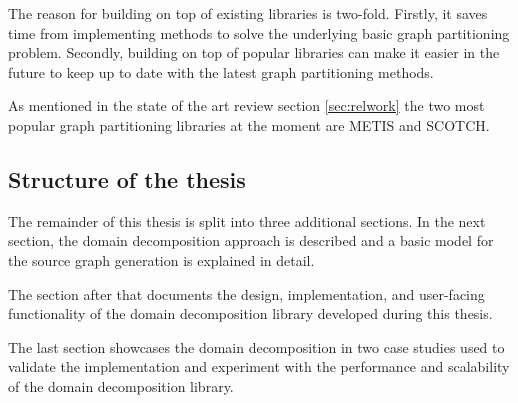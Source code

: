The reason for building on top of existing libraries is two-fold.
Firstly, it saves time from implementing methods to solve the underlying basic graph partitioning problem.
Secondly, building on top of popular libraries can make it easier in the future to keep up to date with the latest graph partitioning methods.

As mentioned in the state of the art review section \ref{sec:relwork} the two most popular graph partitioning libraries at the moment are METIS and SCOTCH.

\subsection{Structure of the thesis}
The remainder of this thesis is split into three additional sections.
In the next section, the domain decomposition approach is described and a basic model for the source graph generation is explained in detail.

The section after that documents the design, implementation, and user-facing functionality of the domain decomposition library developed during this thesis.

The last section showcases the domain decomposition in two case studies used to validate the implementation and experiment with the performance and scalability of the domain decomposition library.

